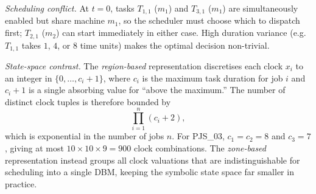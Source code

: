 \textit{Scheduling conflict.}
At $t{=}0$, tasks $T_{1,1}$ ($m_1$) and $T_{3,1}$ ($m_1$) are simultaneously
enabled but share machine $m_1$, so the scheduler must choose which to
dispatch first; $T_{2,1}$ ($m_2$) can start immediately in either case.
High duration variance (e.g.\ $T_{1,1}$ takes $1$, $4$, or $8$ time units)
makes the optimal decision non-trivial.

\textit{State-space contrast.}
The \emph{region-based} representation discretises each clock $x_i$ to an
integer in $\{0,\ldots,c_i{+}1\}$, where $c_i$ is the maximum task duration
for job $i$ and $c_i{+}1$ is a single absorbing value for ``above the
maximum.''  The number of distinct clock tuples is therefore bounded by
\[
  \prod_{i=1}^{n}(c_i + 2),
\]
which is exponential in the number of jobs $n$.  For PJS\_03,
$c_1{=}c_2{=}8$ and $c_3{=}7$, giving at most $10\times10\times9 = 900$
clock combinations.  The \emph{zone-based} representation instead groups all
clock valuations that are indistinguishable for scheduling into a single DBM,
keeping the symbolic state space far smaller in practice.
